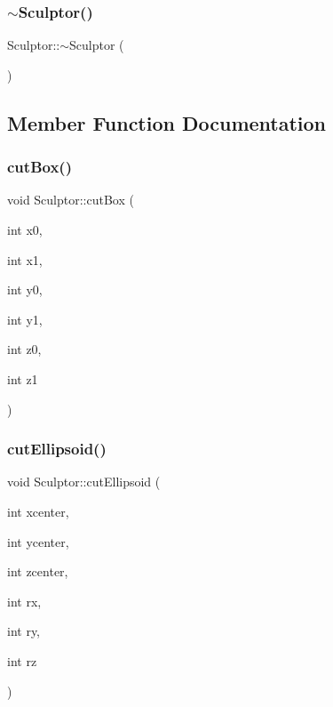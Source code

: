 \subsubsection{\texorpdfstring{$\sim$Sculptor()}{~Sculptor()}}
{\footnotesize\ttfamily Sculptor\+::$\sim$\+Sculptor (\begin{DoxyParamCaption}{ }\end{DoxyParamCaption})}



\subsection{Member Function Documentation}
\mbox{\label{class_sculptor_aa84a1b12b09e9e103fc8d78f8d1bc00f}} 
\subsubsection{\texorpdfstring{cutBox()}{cutBox()}}
{\footnotesize\ttfamily void Sculptor\+::cut\+Box (\begin{DoxyParamCaption}\item[{int}]{x0,  }\item[{int}]{x1,  }\item[{int}]{y0,  }\item[{int}]{y1,  }\item[{int}]{z0,  }\item[{int}]{z1 }\end{DoxyParamCaption})}

\mbox{\label{class_sculptor_a18d2922c111c4c13653ee07d878151ad}} 
\subsubsection{\texorpdfstring{cutEllipsoid()}{cutEllipsoid()}}
{\footnotesize\ttfamily void Sculptor\+::cut\+Ellipsoid (\begin{DoxyParamCaption}\item[{int}]{xcenter,  }\item[{int}]{ycenter,  }\item[{int}]{zcenter,  }\item[{int}]{rx,  }\item[{int}]{ry,  }\item[{int}]{rz }\end{DoxyParamCaption})}

